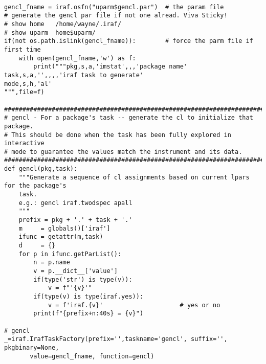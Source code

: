 \begingroup \fontsize{10pt}{10pt}
\selectfont
\begin{verbatim} 

gencl_fname = iraf.osfn("uparm$gencl.par")  # the param file
# generate the gencl par file if not one alread. Viva Sticky!
# show home   /home/wayne/.iraf/
# show uparm  home$uparm/
if(not os.path.islink(gencl_fname)):        # force the parm file if first time
    with open(gencl_fname,'w') as f:
        print("""pkg,s,a,'imstat',,,'package name'
task,s,a,'',,,,'iraf task to generate'
mode,s,h,'al'
""",file=f)

##############################################################################
# gencl - For a package's task -- generate the cl to initialize that package.
# This should be done when the task has been fully explored in interactive
# mode to guarantee the values match the instrument and its data.
##############################################################################
def gencl(pkg,task):
    """Generate a sequence of cl assignments based on current lpars for the package's
    task.
    e.g.: gencl iraf.twodspec apall
    """
    prefix = pkg + '.' + task + '.'
    m     = globals()['iraf']
    ifunc = getattr(m,task)
    d     = {}
    for p in ifunc.getParList():
        n = p.name
        v = p.__dict__['value']
        if(type('str') is type(v)):
            v = f"'{v}'"
        if(type(v) is type(iraf.yes)):
            v = f'iraf.{v}'                     # yes or no
        print(f"{prefix+n:40s} = {v}")

# gencl
_=iraf.IrafTaskFactory(prefix='',taskname='gencl', suffix='', pkgbinary=None,
       value=gencl_fname, function=gencl)

\end{verbatim}
\endgroup
